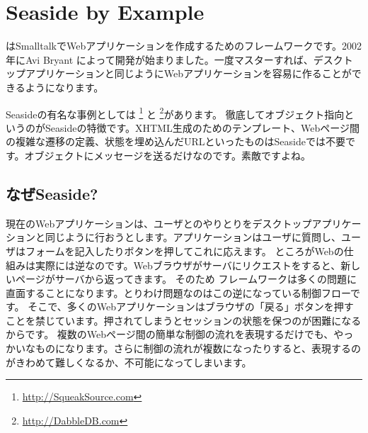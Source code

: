 \documentclass[a4paper,10pt,twoside]{book}
\begin{document}
	\sloppy
\fi
\chapter{Seaside by Example}


 はSmalltalkでWebアプリケーションを作成するためのフレームワークです。2002年にAvi Bryant  によって開発が始まりました。一度マスターすれば、デスクトップアプリケーションと同じようにWebアプリケーションを容易に作ることができるようになります。

Seasideの有名な事例としては \footnote{\url{http://SqueakSource.com}} と \footnote{\url{http://DabbleDB.com}}があります。
徹底してオブジェクト指向というのがSeasideの特徴です。XHTML生成のためのテンプレート、Webページ間の複雑な遷移の定義、状態を埋め込んだURLといったものはSeasideでは不要です。オブジェクトにメッセージを送るだけなのです。素敵ですよね。

\section{なぜSeaside?}

現在のWebアプリケーションは、ユーザとのやりとりをデスクトップアプリケーションと同じように行おうとします。アプリケーションはユーザに質問し、ユーザはフォームを記入したりボタンを押してこれに応えます。
ところがWebの仕組みは実際には逆なのです。Webブラウザがサーバにリクエストをすると、新しいページがサーバから返ってきます。
そのため フレームワークは多くの問題に直面することになります。とりわけ問題なのはこの逆になっている制御フローです。
そこで、多くのWebアプリケーションはブラウザの「戻る」ボタンを押すことを禁じています。押されてしまうとセッションの状態を保つのが困難になるからです。
複数のWebページ間の簡単な制御の流れを表現するだけでも、やっかいなものになります。さらに制御の流れが複数になったりすると、表現するのがきわめて難しくなるか、不可能になってしまいます。

\end{document}
